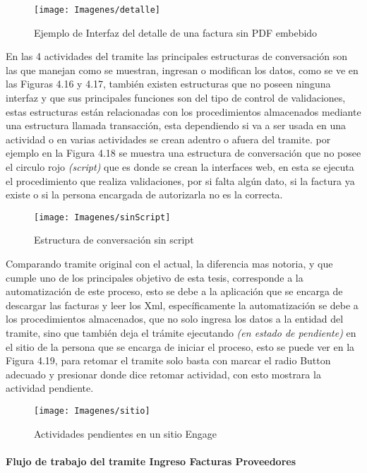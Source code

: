 		\begin{figure}[H]
			\texttt{[image: Imagenes/detalle]}
			\caption{Ejemplo de Interfaz del detalle de una factura sin PDF embebido}
		\end{figure}		
			
		En las 4 actividades del tramite las principales estructuras de conversación son las que manejan como se muestran, ingresan o modifican los datos, como se ve en las Figuras 4.16 y 4.17, también existen estructuras que no poseen ninguna interfaz y que sus principales funciones son del tipo de control de validaciones, estas estructuras están relacionadas con los procedimientos almacenados mediante una estructura llamada transacción, esta dependiendo si va a ser usada en una actividad o en varias actividades se crean adentro o afuera del tramite. por ejemplo en la Figura 4.18 se muestra una estructura de conversación que no posee el circulo rojo \textit{(script)} que es donde se crean la interfaces web, en esta se ejecuta el procedimiento que realiza validaciones, por si falta algún dato, si la factura ya existe o si la persona encargada de autorizarla no es la correcta.

		\begin{figure}[H]
			\centering
			\texttt{[image: Imagenes/sinScript]}
			\caption{Estructura de conversación sin script}
		\end{figure}
		
		Comparando tramite original con el actual, la diferencia mas notoria, y que cumple uno de los principales objetivo de esta tesis, corresponde a la automatización de este proceso, esto se debe a la aplicación que se encarga de descargar las facturas y leer los Xml, específicamente la automatización se debe a los procedimientos almacenados, que no solo ingresa los datos a la entidad del tramite, sino que también deja el trámite ejecutando \textit{(en estado de pendiente)} en el sitio de la persona que se encarga de iniciar el proceso, esto se puede ver en la Figura 4.19, para retomar el tramite solo basta con marcar el radio Button adecuado y presionar donde dice retomar actividad, con esto mostrara la actividad pendiente.

		\begin{figure}[H]
			\texttt{[image: Imagenes/sitio]}
			\caption{Actividades pendientes en un sitio Engage }
		\end{figure}
		
	\paragraph{Flujo de trabajo del tramite Ingreso Facturas Proveedores}
	
